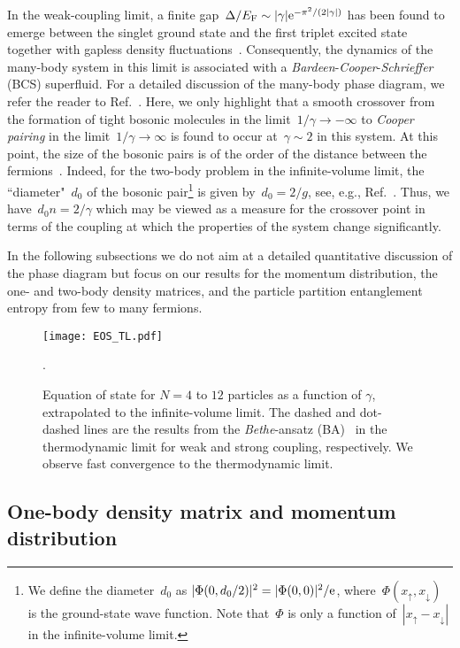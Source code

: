 \documentclass[pra,aps,groupedaddress,floatfix,twocolumn,superscriptaddress,showpacs,nofootinbib]{revtex4-1}
\begin{document}
{In the weak-coupling limit, a {finite
gap~$\Delta/E_{\rm F} \sim |\gamma|{\rm e}^{-\pi^2/(2|\gamma|)}$ has} been found to emerge
between the singlet
ground state and the first triplet excited state together with
gapless density fluctuations~\cite{PhysRev.130.1605,*PhysRev.130.1616,Krivnov,2004PhRvL..93i0408F,wadati}. Consequently,
the dynamics of the many-body system in this limit is
associated with a {\it Bardeen}-{\it Cooper}-{\it Schrieffer} (BCS) superfluid.
For a detailed discussion of the many-body phase diagram, we refer the reader to Ref.~\cite{2004PhRvL..93i0408F}.
Here, {we
only highlight that a smooth crossover from the formation of tight bosonic molecules in the limit~$1/\gamma\to -\infty$
to {\it Cooper pairing} in the limit~$1/\gamma \to \infty$
is found to occur at~$\gamma\sim 2$ in this system.} At this point, the size of the bosonic pairs is
of the order of the distance between the fermions~\cite{2004PhRvL..93i0408F,wadati}.
Indeed, for the two-body problem in the infinite-volume limit,
the ``diameter"~$d_0$ of the bosonic pair\footnote{We define the diameter~$d_0$ as $|\Phi(0,d_0/2)|^2=|\Phi(0,0)|^2/{\rm e}$,
where~$\Phi(x_{\uparrow},x_{\downarrow})$ is the ground-state wave function. Note that~$\Phi$ is only
a function of~$|x_{\uparrow}-x_{\downarrow}|$ in the infinite-volume limit.}
is given by~$d_0=2/g$, see, e.g., Ref.~\cite{Griffiths}. Thus, we have~$d_0n=2/\gamma$ which
may be viewed as a measure for the crossover point in terms of the coupling at which
the properties of the system change significantly.

In the following subsections we do not aim at a detailed quantitative discussion of the phase diagram
but focus on our results for the
momentum distribution, the one- and two-body density matrices, and the
particle partition entanglement entropy from few to many fermions.}
%
\begin{figure}[t]
  \texttt{[image: EOS\_TL.pdf]}
  \caption{Equation of state for $N = 4$ to $12$ particles as a function of $\gamma$,
  extrapolated {to the infinite-volume limit}. The dashed and dot-dashed lines
  are the results from the {\it Bethe}-ansatz (BA)~\cite{wadati} {in the thermodynamic limit} for weak and strong coupling,
  respectively. We observe fast convergence to the thermodynamic limit.}.
  \label{Fig:EOS}
\end{figure}
%

\subsection{One-body density matrix and momentum distribution}
\end{document}
